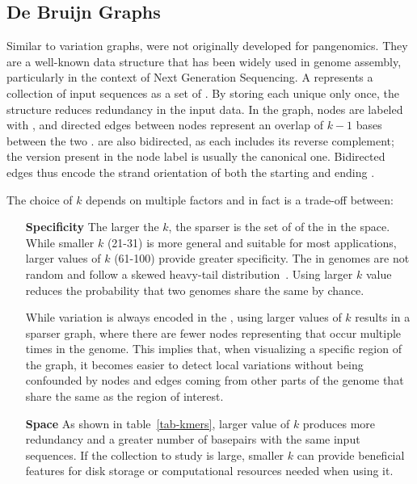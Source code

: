\subsection{De Bruijn Graphs}
\label{sec:dbg_intro}
Similar to variation graphs,  \dbgs were not originally developed for pangenomics. They are a well-known data structure that has been widely used in genome assembly, particularly in the context of Next Generation Sequencing.
A \dbg represents a collection of input sequences as a set of \kmers. By storing each unique \kmer only once, the structure reduces redundancy in the input data. In the graph, nodes are labeled with \kmers, and directed edges between nodes represent an overlap of $k-1$ bases between the two \kmers. \dbgs are also bidirected, as each \kmer includes its reverse complement; the version present in the node label is usually the canonical one. Bidirected edges thus encode the strand orientation of both the starting and ending \kmers.

The choice of $k$ depends on multiple factors and in fact is a trade-off between: 
\begin{itemize}[leftmargin=1.8cm]
	\item[\textbf{Specificity}] The larger the $k$, the sparser is the set of \kmers of the \dbg in the space. While smaller $k$ (21-31) is more general and suitable for most applications, larger values of $k$ (61-100) provide greater specificity. The \kmers in genomes are not random and follow a skewed heavy-tail distribution~\cite{chor2009genomic}. Using larger $k$ value reduces the probability that two genomes share the same \kmer by chance.
	\item[\smash{\stackunder{\textbf{Variation}}{\textbf{resolution}}}]While variation is always encoded in the \dbg, using larger values of $k$ results in a sparser graph, where there are fewer nodes representing \kmers that occur multiple times in the genome. This implies that, when visualizing a specific region of the graph, it becomes easier to detect local variations without being confounded by nodes and edges coming from other parts of the genome that share the same \kmers as the region of interest.
	\item[\textbf{Space}] As shown in table~\ref{tab-kmers}, larger value of $k$ produces more redundancy and a greater number of basepairs with the same input sequences. If the collection to study is large, smaller $k$ can provide beneficial features for disk storage or computational resources needed when using it.
\end{itemize}
